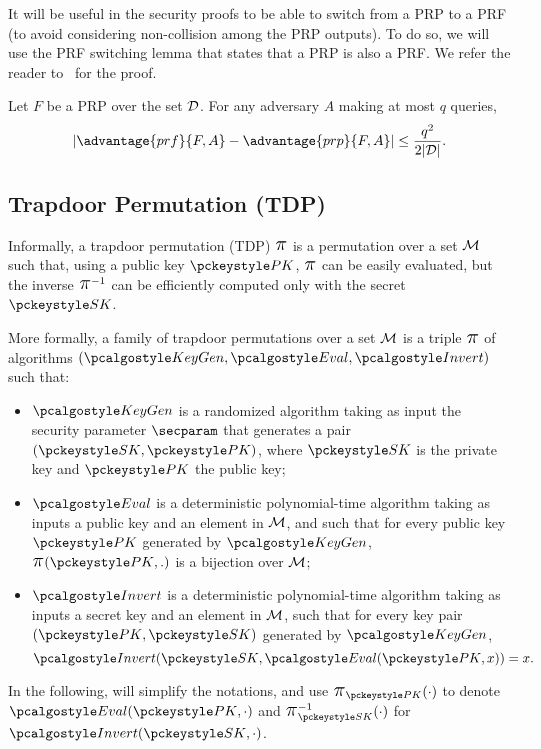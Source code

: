 It will be useful in the security proofs to be able to switch from a PRP to a PRF (to avoid considering non-collision among the PRP outputs).
To do so, we will use the PRF switching lemma that states that a PRP is also a PRF. We refer the reader to~\cite[Lemma 1]{EC:BelRog06} for the proof.
\begin{lemma}
	\label{lem:switching_lemma}
	Let $F$ be a PRP over the set $\mathcal{D}$.
	For any adversary $A$ making at most $q$ queries, 
	\[
		\left| \advantage{prf}{F, A} - \advantage{prp}{F, A} \right| \leq \frac{q^2}{2 |\cD|}.
	\]
\end{lemma}


\subsection{Trapdoor Permutation (TDP)} %
\label{sub:def_tdp}

Informally, a trapdoor permutation (TDP) $\text{\Large{$\pi$}}$ is a permutation over a set $\mathcal{M}$ such that, using a public key $\PK$, $\text{\Large{$\pi$}}$ can be easily evaluated, but the inverse $\text{\Large{$\pi$}}^{-1}$ can be efficiently computed only with the secret $\SK$.

More formally, a family of trapdoor permutations over a set $\mathcal{M}$ is a triple $\text{\Large{$\pi$}}$ of algorithms $(\KeyGen,\allowbreak \Eval, \allowbreak \Invert)$ such that:
\begin{itemize}
	\item $\KeyGen$ is a randomized algorithm taking as input the security parameter $\secparam$ that generates a pair $(\SK, \PK)$, where $\SK$ is the private key and $\PK$ the public key;
	
	\item $\Eval$ is a deterministic polynomial-time algorithm taking as inputs a public key and an element in $\mathcal{M}$, and such that for every public key $\PK$ generated by $\KeyGen$, $\lpi(\PK,.)$ is a bijection over $\mathcal{M}$;
	
	\item $\Invert$ is a deterministic polynomial-time algorithm taking as inputs a secret key and an element in $\mathcal{M}$, such that for every key pair $(\PK,\SK)$ generated by $\KeyGen$, 
	\[\Invert(\SK, \Eval(\PK, x)) = x.\]
\end{itemize}
In the following, will simplify the notations, and use $\lpi_{\PK}(\cdot)$ to denote $\Eval(\PK,\cdot)$ and $\lpi^{-1}_{\SK}(\cdot)$ for $\Invert(\SK,\cdot)$.



